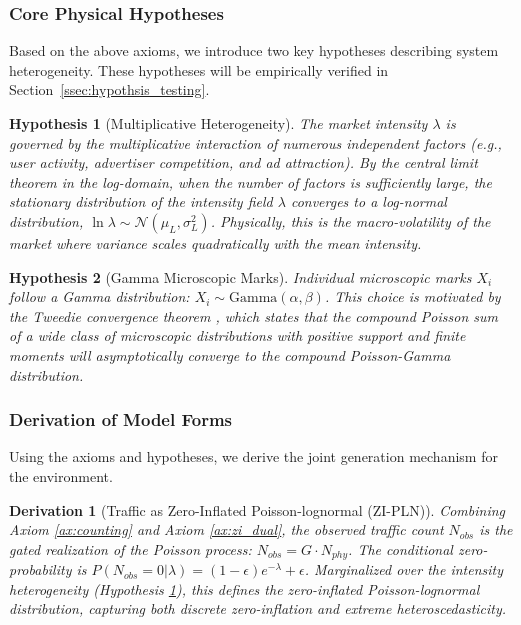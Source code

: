 \documentclass[sigconf, anonymous, review]{acmart}
\newtheorem{hypothesis}{Hypothesis}
\newtheorem{derivation}{Derivation}
\begin{document}
\subsubsection{Core Physical Hypotheses}
\label{sssec:hypotheses}

Based on the above axioms, we introduce two key hypotheses describing system heterogeneity. These hypotheses will be empirically verified in Section~\ref{ssec:hypothsis_testing}.

\begin{hypothesis}[Multiplicative Heterogeneity]
\label{hyp:multiplicative}
The market intensity $\lambda$ is governed by the multiplicative interaction of numerous independent factors (e.g., user activity, advertiser competition, and ad attraction). By the central limit theorem in the log-domain, when the number of factors is sufficiently large, the stationary distribution of the intensity field $\lambda$ converges to a log-normal distribution, $\ln \lambda \sim \mathcal{N}(\mu_{L}, \sigma_{L}^2)$.
Physically, this is the macro-volatility of the market where variance scales quadratically with the mean intensity.
\end{hypothesis}

\begin{hypothesis}[Gamma Microscopic Marks]
\label{hyp:gamma_marks}
Individual microscopic marks $X_i$ follow a Gamma distribution: $X_i \sim \text{Gamma}(\alpha, \beta)$.
This choice is motivated by the Tweedie convergence theorem \cite{jorgensen1997theory}, which states that the compound Poisson sum of a wide class of microscopic distributions with positive support and finite moments will asymptotically converge to the compound Poisson-Gamma distribution.
\end{hypothesis}

\subsubsection{Derivation of Model Forms}

Using the axioms and hypotheses, we derive the joint generation mechanism for the environment.


\begin{derivation}[Traffic as Zero-Inflated Poisson-lognormal (ZI-PLN)]
Combining Axiom \ref{ax:counting} and Axiom \ref{ax:zi_dual}, the observed traffic count $N_{obs}$ is the gated realization of the Poisson process: $N_{obs} = G \cdot N_{phy}$. The conditional zero-probability is $P(N_{obs}=0|\lambda) = (1-\epsilon)e^{-\lambda} + \epsilon$. 
Marginalized over the intensity heterogeneity (Hypothesis \ref{hyp:multiplicative}), this defines the zero-inflated Poisson-lognormal distribution, capturing both discrete zero-inflation and extreme heteroscedasticity.
\end{derivation}
\end{document}

